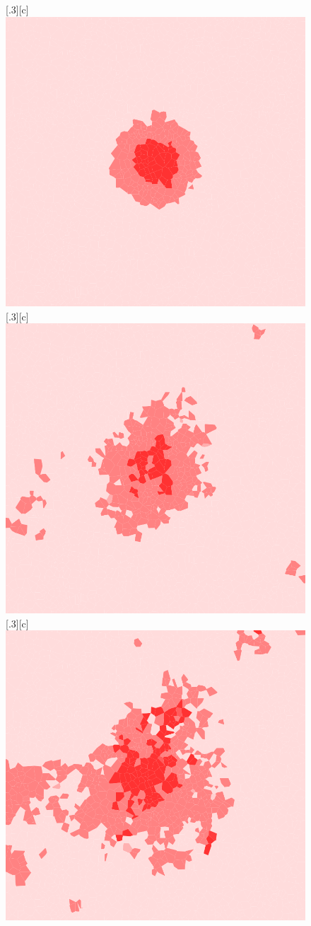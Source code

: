 \documentclass[12pt]{article}
\begin{document}
\begin{figure}[H]
  \centering
  [.3\linewidth][c]{
    \includegraphics[width=.3\linewidth]{images/vca_0.png}
  }
  [.3\linewidth][c]{
    \includegraphics[width=.3\linewidth]{images/vca_500.png}
  }
  [.3\linewidth][c]{
    \includegraphics[width=.3\linewidth]{images/vca_1000.png}
  }


\end{figure}
\end{document}
